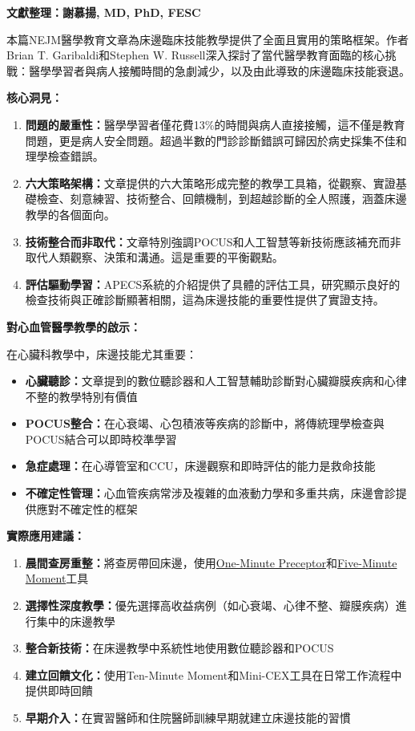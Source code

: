 \documentclass[12pt,a4paper]{article}
\begin{document}
\begin{importantbox}
\textbf{文獻整理：謝慕揚, MD, PhD, FESC}

本篇NEJM醫學教育文章為床邊臨床技能教學提供了全面且實用的策略框架。作者Brian T. Garibaldi和Stephen W. Russell深入探討了當代醫學教育面臨的核心挑戰：醫學學習者與病人接觸時間的急劇減少，以及由此導致的床邊臨床技能衰退。

\textbf{核心洞見：}

\begin{enumerate}
\item \textbf{問題的嚴重性：}醫學學習者僅花費13\%的時間與病人直接接觸，這不僅是教育問題，更是病人安全問題。超過半數的門診診斷錯誤可歸因於病史採集不佳和理學檢查錯誤。

\item \textbf{六大策略架構：}文章提供的六大策略形成完整的教學工具箱，從觀察、實證基礎檢查、刻意練習、技術整合、回饋機制，到超越診斷的全人照護，涵蓋床邊教學的各個面向。

\item \textbf{技術整合而非取代：}文章特別強調POCUS和人工智慧等新技術應該補充而非取代人類觀察、決策和溝通。這是重要的平衡觀點。

\item \textbf{評估驅動學習：}APECS系統的介紹提供了具體的評估工具，研究顯示良好的檢查技術與正確診斷顯著相關，這為床邊技能的重要性提供了實證支持。
\end{enumerate}

\textbf{對心血管醫學教學的啟示：}

在心臟科教學中，床邊技能尤其重要：

\begin{itemize}
\item \textbf{心臟聽診：}文章提到的數位聽診器和人工智慧輔助診斷對心臟瓣膜疾病和心律不整的教學特別有價值
\item \textbf{POCUS整合：}在心衰竭、心包積液等疾病的診斷中，將傳統理學檢查與POCUS結合可以即時校準學習
\item \textbf{急症處理：}在心導管室和CCU，床邊觀察和即時評估的能力是救命技能
\item \textbf{不確定性管理：}心血管疾病常涉及複雜的血液動力學和多重共病，床邊會診提供應對不確定性的框架
\end{itemize}

\textbf{實際應用建議：}

\begin{enumerate}
\item \textbf{晨間查房重整：}將查房帶回床邊，使用\href{https://meded.ucsf.edu/resource/clinical-teaching-tools-omp-and-snapps}{One-Minute Preceptor}和\href{https://www.amjmed.com/article/S0002-9343(16)30209-1/fulltext}{Five-Minute Moment}工具
\item \textbf{選擇性深度教學：}優先選擇高收益病例（如心衰竭、心律不整、瓣膜疾病）進行集中的床邊教學
\item \textbf{整合新技術：}在床邊教學中系統性地使用數位聽診器和POCUS
\item \textbf{建立回饋文化：}使用Ten-Minute Moment和Mini-CEX工具在日常工作流程中提供即時回饋
\item \textbf{早期介入：}在實習醫師和住院醫師訓練早期就建立床邊技能的習慣
\end{enumerate}


\end{importantbox}
\end{document}
